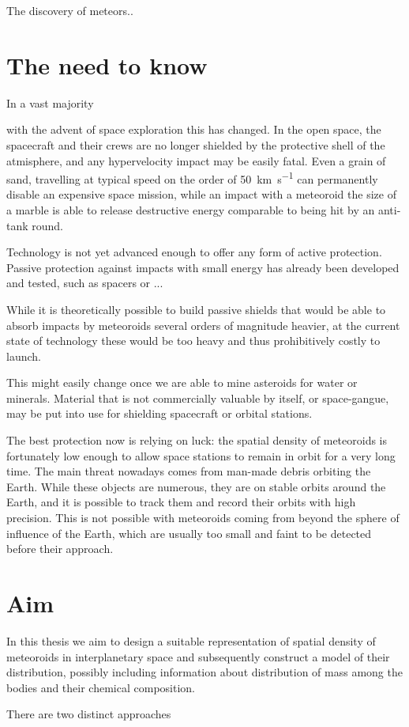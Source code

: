
The discovery of meteors..


\section{The need to know}
    In a vast majority

    with the advent of space exploration this has changed. In the open space, the spacecraft and their crews are no longer shielded
    by the protective shell of the atmisphere, and any hypervelocity impact may be easily fatal.
    Even a grain of sand, travelling at typical speed on the order of \SI{50}{\kilo\metre\per\second} can permanently disable
    an expensive space mission, while an impact with a meteoroid the size of a marble is able to release
    destructive energy comparable to being hit by an anti-tank round.

    Technology is not yet advanced enough to offer any form of active protection.
    Passive protection against impacts with small energy has already been developed and tested,
    such as spacers \cite{...} or ...

    While it is theoretically possible to build passive shields that would be able to absorb impacts
    by meteoroids several orders of magnitude heavier, at the current state of technology these would
    be too heavy and thus prohibitively costly to launch.

    This might easily change once we are able to mine asteroids for water or minerals.
    Material that is not commercially valuable by itself, or space-gangue, may be put into use
    for shielding spacecraft or orbital stations.

    The best protection now is relying on luck: the spatial density of meteoroids is fortunately low enough
    to allow space stations to remain in orbit for a very long time. The main threat nowadays comes
    from man-made debris orbiting the Earth. While these objects are numerous, they are on stable orbits around
    the Earth, and it is possible to track them and record their orbits with high precision.
    This is not possible with meteoroids coming from beyond the sphere of influence of the Earth,
    which are usually too small and faint to be detected before their approach.

\section{Aim}
    In this thesis we aim to design a suitable representation of spatial density of meteoroids
    in interplanetary space and subsequently construct a model of their distribution,
    possibly including information about distribution of mass among the bodies and their chemical composition.

    There are two distinct approaches
